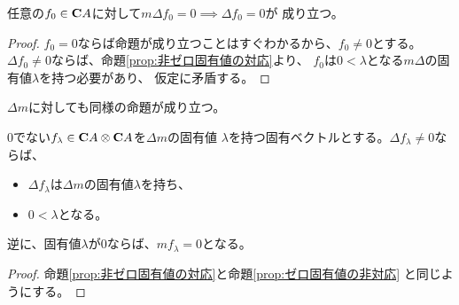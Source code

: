 	\begin{proposition}[ゼロ固有値の非対応]\label{prop:ゼロ固有値の非対応} %
		任意の$f_0\in{\mathbf{C}}A$に対して$m\Delta f_0=0\implies\Delta f_0=0$が
		成り立つ。
	\end{proposition} %
	\begin{proof} %
		$f_0=0$ならば命題が成り立つことはすぐわかるから、$f_0\neq0$とする。
		$\Delta f_0\neq0$ならば、命題\ref{prop:非ゼロ固有値の対応}より、
		$f_0$は$0<\lambda$となる$m\Delta$の固有値$\lambda$を持つ必要があり、
		仮定に矛盾する。
	\end{proof} %

	$\Delta m$に対しても同様の命題が成り立つ。

	\begin{proposition}[テンソル積での固有値の対応]\label{prop:テンソル積での固有値の対応} %
		$0$でない$f_\lambda\in{\mathbf{C}}A\otimes{\mathbf{C}}A$を$\Delta m$の固有値
		$\lambda$を持つ固有ベクトルとする。$\Delta f_\lambda\neq0$ならば、
		\begin{itemize}\setlength{\itemsep}{-1mm} %
			\item $\Delta f_\lambda$は$\Delta m$の固有値$\lambda$を持ち、
			\item $0<\lambda$となる。
		\end{itemize} %
		逆に、固有値$\lambda$が$0$ならば、$mf_\lambda=0$となる。
	\end{proposition} %
	\begin{proof} %
		命題\ref{prop:非ゼロ固有値の対応}と命題\ref{prop:ゼロ固有値の非対応}
		と同じようにする。
	\end{proof} %

